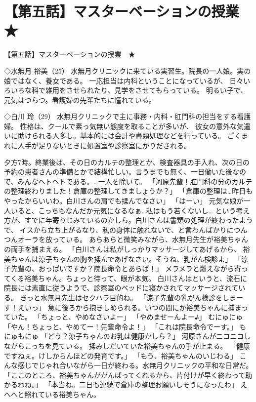 \section{【第五話】マスターベーションの授業　★}
【第五話】マスターベーションの授業　★


◇水無月 裕美（25）
水無月クリニックに来ている実習生。院長の一人娘。実の娘ではなく、養女である。
一応担当は内科ということになっているが、
日々いろいろな科で雑用をさせられたり、見学をさせてもらっている。
明るい子で、元気はつらつ。看護婦の先輩たちに憧れている。

◇白川 玲（29）
水無月クリニックで主に事務・内科・肛門科の担当をする看護婦。
性格は、クールで素っ気無い態度を取ることが多いが、
彼女の意外な気遣いに助けられる人多し。基本的には会計や書類処理などを行っている。
ごくまれに人手が足りないときに処置室や診察室にかりだされる。

夕方7時。終業後は、その日のカルテの整理とか、検査器具の手入れ、次の日の予約の患者さんの準備とかで結構忙しい。言うまでも無く、一日働いた後なので、みんなヘトヘトである。…一人を除いて。
「河原先輩！肛門科の分のカルテの整理終わりました！倉庫の整理してきましょうか？」
「倉庫の整理は…昨日もやったからいいわ。白川さんの肩でも揉んでなさい」
「はーい」
元気な娘が一人いると、こっちもなんだか元気になるなぁ…私はもう若くないし…
という考え方が、すでに年寄りじみているのかしら。白川さんは書類の処理が終わったようで、
イスから立ち上がるなり、私の身体に触れないで、と言わんばかりにつんつんオーラを放っている。
あらあらと微笑みながら、水無月先生が裕美ちゃんの両手を捕まえる。
「白川さんは私がしっかりマッサージしてあげるから、
裕美ちゃんは涼子ちゃんの胸を揉んであげなさい。そうね、乳がん検診よ」
「涼子先輩の、おっぱいですか？院長命令とあらば！」
メラメラと燃えながら寄ってくる裕美ちゃん。ちょっと待って、眼が本気。
白川さんはというと、流石に院長には素直に従うようで、診察室のベッドに寝かされてマッサージされている。
きっと水無月先生はセクハラ目的ね。
「涼子先輩の乳がん検診をしまーす！えいっ」
急に後ろから抱きしめられる。いつの間にか裕美ちゃんに捕まっていた。
「ちょっと、やめなさいよー」
「やめませーんよー♪」
むにゅにゅ
「やん！ちょっと、やめてー！先輩命令よ！」
「これは院長命令でーす。」
もにゅもにゅ
「どう？涼子ちゃんのお乳は健康かしら？」
河原さんがニコニコしながらこっちを見ている。
揉みしだいていた裕美ちゃんの手が止まる。
「健康ですねぇ。けしからんほどの発育です。」
「もう、裕美ちゃんのいじわる」
こんな感じでじゃれ合いながら一日が終わる。水無月クリニックの平和な日常だ。
「ここのところ、裕美ちゃんががんばってくれるから、片付けが早く終わって助かるわね。」
「本当ね。二日も連続で倉庫の整理お願いしそうになったわ」
えへへと照れている裕美ちゃん。


